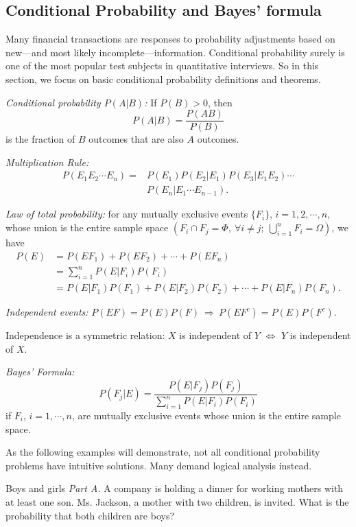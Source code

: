 \subsection{Conditional Probability and Bayes' formula}
Many financial transactions are responses to probability adjustments based on new---and most
likely incomplete---information. Conditional probability surely is one of the most popular
test subjects in quantitative interviews. So in this section, we focus on basic conditional
probability definitions and theorems.

\noindent\emph{Conditional probability $P(A\vert B)$:} If $P(B)>0$, then
\[
P(A\vert B)=\dfrac{P(AB)}{P(B)}
\]
is the fraction of $B$ outcomes that are also $A$ outcomes.

\noindent\emph{Multiplication Rule:}
\[
\begin{aligned}
P(E_1E_2\cdots E_n)={}&P(E_1)P(E_2\vert E_1)P(E_3\vert E_1E_2)\cdots\\
&P(E_n\vert E_1\cdots E_{n-1}).
\end{aligned}
\]


\noindent\emph{Law of total probability:} for any mutually exclusive events
$\{F_i\}$, $i=1,2,\cdots,n$, whose union is the entire sample space
$(F_i\cap F_j=\Phi,\ \forall i\ne j;\ \bigcup_{i=1}^{n}F_i=\Omega)$, we have
\[
\begin{aligned}
P(E)&=P(EF_1)+P(EF_2)+\cdots+P(EF_n)\\
&=\sum_{i=1}^{n}P(E\vert F_i)P(F_i)\\
&=P(E\vert F_1)P(F_1)+P(E\vert F_2)P(F_2)+\cdots+P(E\vert F_n)P(F_n).
\end{aligned}
\]

\noindent\emph{Independent events:} $P(EF)=P(E)P(F)\ \Rightarrow\ P(EF^c)=P(E)P(F^c)$.

Independence is a symmetric relation: $X$ is independent of $Y$ $\Leftrightarrow$ $Y$ is
independent of $X$.

\noindent\emph{Bayes' Formula:}
\[
P(F_j\vert E)=\dfrac{P(E\vert F_j)P(F_j)}{\sum_{i=1}^{n}P(E\vert F_i)P(F_i)}
\]
if $F_i$, $i=1,\cdots,n$, are mutually exclusive events whose union is the entire sample
space.

As the following examples will demonstrate, not all conditional probability problems have
intuitive solutions. Many demand logical analysis instead.

\begin{problem}{Boys and girls}
\emph{Part A.} A company is holding a dinner for working mothers with at least one son. Ms.
Jackson, a mother with two children, is invited. What is the probability that both children are
boys?
\end{problem}

